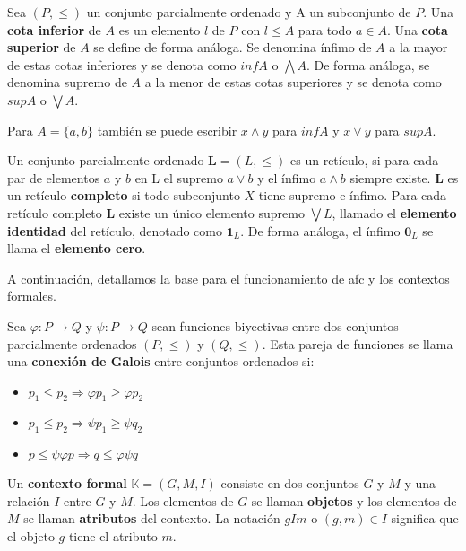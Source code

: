 \documentclass[../../main.tex]{subfiles}
\begin{document}
\begin{definicion}
Sea $(P,\leq)$ un conjunto parcialmente ordenado y A un subconjunto de $P$. Una \textbf{cota inferior} de $A$ es un elemento $l$ de $P$ con $l \leq A$ para todo $a \in A$. Una \textbf{cota superior} de $A$ se define de forma análoga. Se denomina ínfimo de $A$ a la mayor de estas cotas inferiores y se denota como $inf A$ o $\bigwedge A$. De forma análoga, se denomina supremo de $A$ a la menor de estas cotas superiores y se denota como $sup A$ o $\bigvee A$.
\end{definicion}

Para $A = {\{a,b\}}$ también se puede escribir $x \wedge y$ para $inf A$ y $x \vee y$ para $sup A$.


\begin{definicion}
Un conjunto parcialmente ordenado $\textbf{L} = (L, \leq)$ es un retículo, si para cada par de elementos $a$ y $b$ en L el supremo $a \vee b$ y el ínfimo $a \wedge b$ siempre existe. $\textbf{L}$ es un retículo \textbf{completo} si todo subconjunto $X$ tiene supremo e ínfimo. Para cada retículo completo $\textbf{L}$ existe un único elemento supremo $\bigvee L$, llamado el \textbf{elemento identidad} del retículo, denotado como $\textbf{1}_L$. De forma análoga, el ínfimo $\textbf{0}_L$ se llama el \textbf{elemento cero}.
\end{definicion}

A continuación, detallamos la base para el funcionamiento de \gls{afc} y los contextos formales.

\begin{definicion}
Sea $\varphi : P \rightarrow Q$ y $\psi : P \rightarrow Q$ sean funciones biyectivas entre dos conjuntos parcialmente ordenados $(P,\leq)$ y $(Q,\leq)$. Esta pareja de funciones se llama una \textbf{conexión de Galois} entre conjuntos ordenados si:
\begin{itemize}
    \item $p_1 \leq p_2 \Longrightarrow \varphi p_1 \geq \varphi p_2$
    \item $p_1 \leq p_2 \Longrightarrow \psi p_1 \geq \psi q_2$
    \item $p \leq \psi \varphi p \Longrightarrow q \leq \varphi \psi q$
\end{itemize}
\end{definicion}

\begin{definicion}
Un \textbf{contexto formal} $\mathbb{K} = (G, M, I)$ consiste en dos conjuntos $G$ y $M$ y una relación $I$ entre $G$ y $M$. Los elementos de $G$ se llaman \textbf{objetos} y los elementos de $M$ se llaman \textbf{atributos} del contexto. La notación $gIm$ o $(g, m) \in I$ significa que el objeto $g$ tiene el atributo $m$.
\end{definicion}
\end{document}
